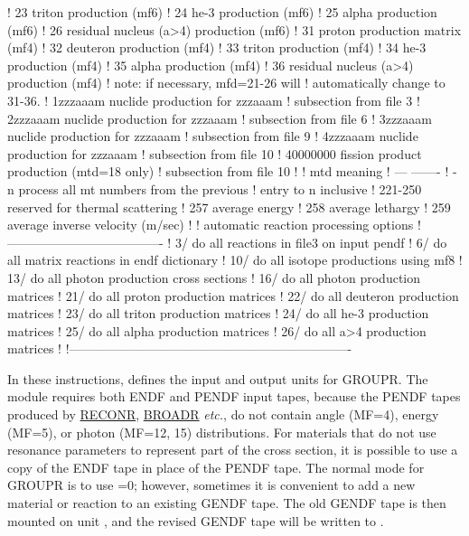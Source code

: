 \begin{ccode}
   !     23           triton production (mf6)
   !     24           he-3 production (mf6)
   !     25           alpha production (mf6)
   !     26           residual nucleus (a>4) production (mf6)
   !     31           proton production matrix (mf4)
   !     32           deuteron production (mf4)
   !     33           triton production (mf4)
   !     34           he-3 production (mf4)
   !     35           alpha production (mf4)
   !     36           residual nucleus (a>4) production (mf4)
   !          note: if necessary, mfd=21-26 will
   !          automatically change to 31-36.
   !    1zzzaaam       nuclide production for zzzaaam
   !                     subsection from file 3
   !    2zzzaaam       nuclide production for zzzaaam
   !                     subsection from file 6
   !    3zzzaaam       nuclide production for zzzaaam
   !                     subsection from file 9
   !    4zzzaaam       nuclide production for zzzaaam
   !                     subsection from file 10
   !    40000000       fission product production (mtd=18 only)
   !                     subsection from file 10
   !
   !     mtd          meaning
   !     ---          -------
   !     -n           process all mt numbers from the previous
   !                          entry to n inclusive
   !     221-250      reserved for thermal scattering
   !     257          average energy
   !     258          average lethargy
   !     259          average inverse velocity (m/sec)
   !
   !     automatic reaction processing options
   !     -------------------------------------
   !        3/        do all reactions in file3 on input pendf
   !        6/        do all matrix reactions in endf dictionary
   !       10/        do all isotope productions using mf8
   !       13/        do all photon production cross sections
   !       16/        do all photon production matrices
   !       21/        do all proton production matrices
   !       22/        do all deuteron production matrices
   !       23/        do all triton production matrices
   !       24/        do all he-3 production matrices
   !       25/        do all alpha production matrices
   !       26/        do all a>4 production matrices
   !
   !-------------------------------------------------------------------

\end{ccode}
\normalsize

In these instructions,  defines the input and output units
for GROUPR.  The module requires both ENDF and PENDF input tapes,
because the PENDF tapes produced by
\hyperlink{sRECONRhy}{RECONR},
\hyperlink{sBROADRhy}{BROADR} {\it etc.}, do not
contain angle (MF=4),
energy (MF=5), or photon (MF=12, 15) distributions.  For materials
that do not use resonance parameters to represent part of the
cross section, it is possible to use a copy of the ENDF tape in place
of the PENDF tape.  The normal mode for GROUPR is to use =0;
however, sometimes it is convenient to add a new material or reaction to
an existing GENDF tape.  The old GENDF tape is then mounted on unit
, and the revised GENDF tape will be written to .

